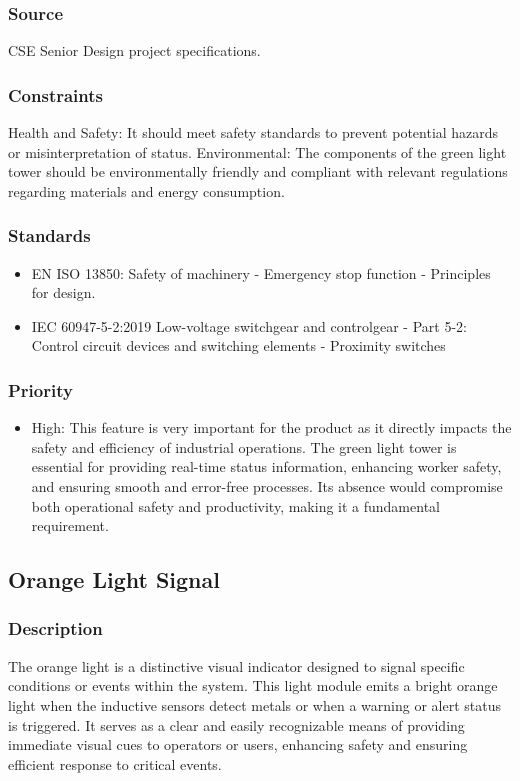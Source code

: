 \subsubsection{Source}
CSE Senior Design project specifications.
\subsubsection{Constraints}
Health and Safety: It should meet safety standards to prevent potential hazards or misinterpretation of status.
Environmental: The components of the green light tower should be environmentally friendly and compliant with relevant regulations regarding materials and energy consumption.
\subsubsection{Standards}
\begin{itemize}
\item EN ISO 13850: Safety of machinery - Emergency stop function - Principles for design.
\item IEC 60947-5-2:2019 Low-voltage switchgear and controlgear - Part 5-2: Control circuit devices and switching elements - Proximity switches
\end{itemize}
\subsubsection{Priority}
\begin{itemize}
\item High:
This feature is very important for the product as it directly impacts the safety and efficiency of industrial operations. The green light tower is essential for providing real-time status information, enhancing worker safety, and ensuring smooth and error-free processes. Its absence would compromise both operational safety and productivity, making it a fundamental requirement.
\end{itemize}
\subsection{Orange Light Signal}
\subsubsection{Description}
The orange light is a distinctive visual indicator designed to signal specific conditions or events within the system. This light module emits a bright orange light when the inductive sensors detect metals or when a warning or alert status is triggered. It serves as a clear and easily recognizable means of providing immediate visual cues to operators or users, enhancing safety and ensuring efficient response to critical events.
